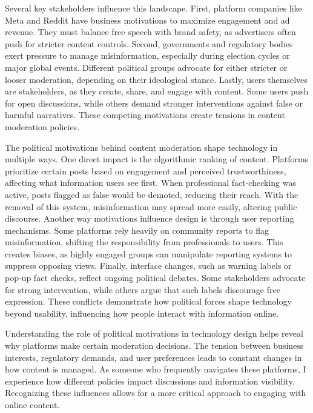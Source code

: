 \documentclass[
	letterpaper, %
]{jdf}
\begin{document}
Several key stakeholders influence this landscape. First, platform companies like Meta and Reddit have business motivations to maximize engagement and ad revenue. They must balance free speech with brand safety, as advertisers often push for stricter content controls. Second, governments and regulatory bodies exert pressure to manage misinformation, especially during election cycles or major global events. Different political groups advocate for either stricter or looser moderation, depending on their ideological stance. Lastly, users themselves are stakeholders, as they create, share, and engage with content. Some users push for open discussions, while others demand stronger interventions against false or harmful narratives. These competing motivations create tensions in content moderation policies.

The political motivations behind content moderation shape technology in multiple ways. One direct impact is the algorithmic ranking of content. Platforms prioritize certain posts based on engagement and perceived trustworthiness, affecting what information users see first. When professional fact-checking was active, posts flagged as false would be demoted, reducing their reach. With the removal of this system, misinformation may spread more easily, altering public discourse. Another way motivations influence design is through user reporting mechanisms. Some platforms rely heavily on community reports to flag misinformation, shifting the responsibility from professionals to users. This creates biases, as highly engaged groups can manipulate reporting systems to suppress opposing views. Finally, interface changes, such as warning labels or pop-up fact checks, reflect ongoing political debates. Some stakeholders advocate for strong intervention, while others argue that such labels discourage free expression. These conflicts demonstrate how political forces shape technology beyond usability, influencing how people interact with information online.

Understanding the role of political motivations in technology design helps reveal why platforms make certain moderation decisions. The tension between business interests, regulatory demands, and user preferences leads to constant changes in how content is managed. As someone who frequently navigates these platforms, I experience how different policies impact discussions and information visibility. Recognizing these influences allows for a more critical approach to engaging with online content.

\newpage
\end{document}
